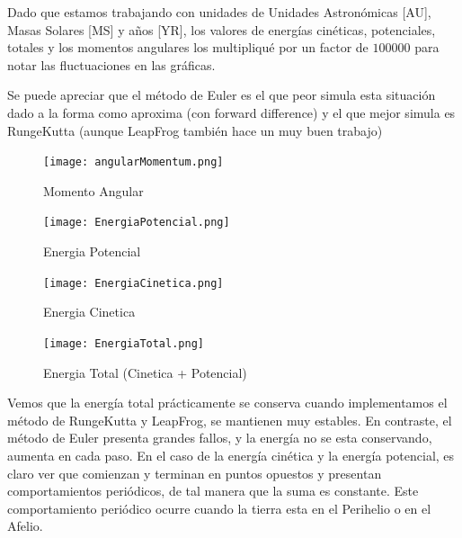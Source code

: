 \documentclass{article}
\begin{document}
Dado que estamos trabajando con unidades de Unidades Astron\'omicas [AU], Masas Solares [MS] y a\~nos [YR], los valores de energ\'ias cin\'eticas, potenciales, totales y los momentos angulares los multipliqu\'e por un factor de $100000$ para notar las fluctuaciones en las gr\'aficas.

Se puede apreciar que el m\'etodo de Euler es el que peor simula esta situaci\'on dado a la forma como aproxima (con forward difference) y el que mejor simula es RungeKutta (aunque LeapFrog tambi\'en hace un muy buen trabajo)

\begin{figure}[!htbp]
 \centering
  \texttt{[image: angularMomentum.png]}
  \caption{Momento Angular}
\end{figure}

\begin{figure}[!htbp]
 \centering
  \texttt{[image: EnergiaPotencial.png]}
  \caption{Energia Potencial}
\end{figure}

\begin{figure}[!htbp]
 \centering
  \texttt{[image: EnergiaCinetica.png]}
  \caption{Energia Cinetica}
\end{figure}

\begin{figure}[!htbp]
 \centering
  \texttt{[image: EnergiaTotal.png]}
  \caption{Energia Total (Cinetica + Potencial)}
\end{figure}

Vemos que la energ\'ia total pr\'acticamente se conserva cuando implementamos el m\'etodo de RungeKutta y LeapFrog, se mantienen muy estables. En contraste, el m\'etodo de Euler presenta grandes fallos, y la energ\'ia no se esta conservando, aumenta en cada paso. En el caso de la energ\'ia cin\'etica y la energ\'ia potencial, es claro ver que comienzan y terminan en puntos opuestos y presentan comportamientos peri\'odicos, de tal manera que la suma es constante. Este comportamiento peri\'odico ocurre cuando la tierra esta en el Perihelio o en el Afelio.
\end{document}
